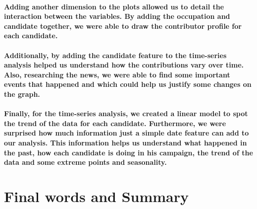 \documentclass[]{article}
\let\oldparagraph\paragraph
\renewcommand{\paragraph}[1]{\oldparagraph{#1}\mbox{}}
\begin{document}
\paragraph{Adding another dimension to the plots allowed us to detail
the interaction between the variables. By adding the occupation and
candidate together, we were able to draw the contributor profile for
each
candidate.}\label{adding-another-dimension-to-the-plots-allowed-us-to-detail-the-interaction-between-the-variables.-by-adding-the-occupation-and-candidate-together-we-were-able-to-draw-the-contributor-profile-for-each-candidate.}

\paragraph{Additionally, by adding the candidate feature to the
time-series analysis helped us understand how the contributions vary
over time. Also, researching the news, we were able to find some
important events that happened and which could help us justify some
changes on the
graph.}\label{additionally-by-adding-the-candidate-feature-to-the-time-series-analysis-helped-us-understand-how-the-contributions-vary-over-time.-also-researching-the-news-we-were-able-to-find-some-important-events-that-happened-and-which-could-help-us-justify-some-changes-on-the-graph.}

\paragraph{Finally, for the time-series analysis, we created a linear
model to spot the trend of the data for each candidate. Furthermore, we
were surprised how much information just a simple date feature can add
to our analysis. This information helps us understand what happened in
the past, how each candidate is doing in his campaign, the trend of the
data and some extreme points and
seasonality.}\label{finally-for-the-time-series-analysis-we-created-a-linear-model-to-spot-the-trend-of-the-data-for-each-candidate.-furthermore-we-were-surprised-how-much-information-just-a-simple-date-feature-can-add-to-our-analysis.-this-information-helps-us-understand-what-happened-in-the-past-how-each-candidate-is-doing-in-his-campaign-the-trend-of-the-data-and-some-extreme-points-and-seasonality.}

\section{Final words and Summary}\label{final-words-and-summary}
\end{document}
